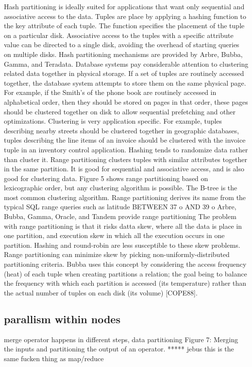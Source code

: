 \documentclass[10pt,twocolumn]{IEEEtran11}
\begin{document}
Hash partitioning is ideally suited for applications that want only sequential and
associative access to the data. Tuples are place by applying a hashing function to the key
attribute of each tuple. The function specifies the placement of the tuple on a particular disk.
Associative access to the tuples with a specific attribute value can be directed to a single disk,
avoiding the overhead of starting queries on multiple disks. Hash partitioning mechanisms are
provided by Arbre, Bubba, Gamma, and Teradata.
Database systems pay considerable attention to clustering related data together in physical
storage. If a set of tuples are routinely accessed together, the database system attempts to store
them on the same physical page. For example, if the Smith's of the phone book are routinely
accessed in alphabetical order, then they should be stored on pages in that order, these pages
should be clustered together on disk to allow sequential prefetching and other optimizations.
Clustering is very application specific. For example, tuples describing nearby streets should be
clustered together in geographic databases, tuples describing the line items of an invoice should
be clustered with the invoice tuple in an inventory control application.
Hashing tends to randomize data rather than cluster it. Range partitioning clusters tuples
with similar attributes together in the same partition. It is good for sequential and associative
access, and is also good for clustering data. Figure 5 shows range partitioning based on
lexicographic order, but any clustering algorithm is possible. The B-tree is the most common
clustering algorithm. Range partitioning derives its name from the typical SQL range queries
such as
latitude BETWEEN 37
o AND 39
o
Arbre, Bubba, Gamma, Oracle, and Tandem provide range partitioning
The problem with range partitioning is that it risks datta skew, where all the data is place
in one partition, and execution skew in which all the execution occurs in one partition. Hashing
and round-robin are less susceptible to these skew problems. Range partitioning can minimize
skew by picking non-uniformly-distributed partitioning criteria. Bubba uses this concept by
considering the access frequency (heat) of each tuple when creating partitions a relation; the goal
being to balance the frequency with which each partition is accessed (its temperature) rather than
the actual number of tuples on each disk (its volume) [COPE88].


\subsection{parallism within nodes}
merge operator happens in different steps, data partitioning
Figure 7: Merging the inputs and partitioning the output of an operator. ***** jebus this is the same fucken thing as map/reduce
\end{document}
